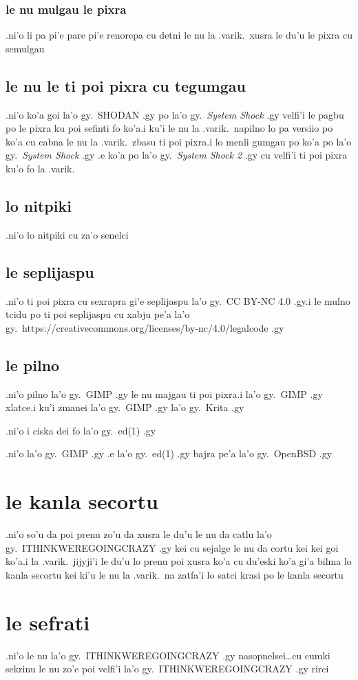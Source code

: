 \documentclass{report}
\begin{document}
\subsubsection{le nu mulgau le pixra}
.ni'o li pa pi'e pare pi'e renorepa cu detni le nu la .varik.\ xusra le du'u le pixra cu semulgau
\subsection{le nu le ti poi pixra cu tegumgau}
.ni'o ko'a goi la'o gy.\ SHODAN .gy po la'o gy.\ \textit{System Shock} .gy velfi'i le pagbu po le pixra ku poi sefinti fo ko'a\@  .i ku'i le nu la .varik.\ napilno lo pa versiio po ko'a cu cabna le nu la .varik.\ zbasu ti poi pixra\@  .i lo menli gumgau po ko'a po la'o gy.\ \textit{System Shock} .gy .e ko'a po la'o gy.\ \textit{System Shock 2} .gy cu velfi'i ti poi pixra ku'o fo la .varik.
\subsection{lo nitpiki}
.ni'o lo nitpiki cu za'o senelci
\subsection{le seplijaspu}
.ni'o ti poi pixra cu sexrapra gi'e seplijaspu la'o gy.\ CC BY-NC 4.0 .gy\@ .i le mulno tcidu po ti poi seplijaspu cu xabju pe'a la'o gy.\ https://creativecommons.org/licenses/by-nc/4.0/legalcode .gy
\subsection{le pilno}
.ni'o pilno la'o gy.\ GIMP .gy le nu majgau ti poi pixra\@ .i  la'o gy.\ GIMP .gy xlatce\@ .i ku'i zmanei la'o gy.\ GIMP .gy la'o gy.\ Krita .gy

.ni'o i ciska dei fo la'o gy.\ ed(1) .gy

.ni'o la'o gy.\ GIMP .gy .e la'o gy.\ ed(1) .gy bajra pe'a la'o gy.\ OpenBSD .gy
\section{le kanla secortu}
.ni'o so'u da poi prenu zo'u da xusra le du'u le nu da catlu la'o gy.\ ITHINKWEREGOINGCRAZY .gy kei cu sejalge le nu da cortu kei kei goi ko'a\@  .i la .varik.\ jijyji'i le du'u lo prenu poi xusra ko'a cu du'eski ko'a gi'a bilma lo kanla secortu kei ki'u le nu la .varik.\ na zatfa'i lo satci krasi po le kanla secortu
\section{le sefrati}
.ni'o le nu la'o gy.\ ITHINKWEREGOINGCRAZY .gy nasopnelsei\ldots cu cumki sekrinu le nu zo'e poi velfi'i la'o gy.\ ITHINKWEREGOINGCRAZY .gy rirci
\end{document}
